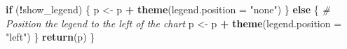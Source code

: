 \documentclass[
]{article}
\newenvironment{Shaded}{\begin{snugshade}}{\end{snugshade}}
\newcommand{\AttributeTok}[1]{\textcolor[rgb]{0.13,0.29,0.53}{#1}}
\newcommand{\CommentTok}[1]{\textcolor[rgb]{0.56,0.35,0.01}{\textit{#1}}}
\newcommand{\ControlFlowTok}[1]{\textcolor[rgb]{0.13,0.29,0.53}{\textbf{#1}}}
\newcommand{\FunctionTok}[1]{\textcolor[rgb]{0.13,0.29,0.53}{\textbf{#1}}}
\newcommand{\NormalTok}[1]{#1}
\newcommand{\OtherTok}[1]{\textcolor[rgb]{0.56,0.35,0.01}{#1}}
\newcommand{\SpecialCharTok}[1]{\textcolor[rgb]{0.81,0.36,0.00}{\textbf{#1}}}
\newcommand{\StringTok}[1]{\textcolor[rgb]{0.31,0.60,0.02}{#1}}
\begin{document}
\begin{Shaded}
\begin{Highlighting}[]
  \ControlFlowTok{if}\NormalTok{ (}\SpecialCharTok{!}\NormalTok{show\_legend) \{}
\NormalTok{    p }\OtherTok{\textless{}{-}}\NormalTok{ p }\SpecialCharTok{+} \FunctionTok{theme}\NormalTok{(}\AttributeTok{legend.position =} \StringTok{"none"}\NormalTok{)}
\NormalTok{  \} }\ControlFlowTok{else}\NormalTok{ \{}
    \CommentTok{\# Position the legend to the left of the chart}
\NormalTok{    p }\OtherTok{\textless{}{-}}\NormalTok{ p }\SpecialCharTok{+} \FunctionTok{theme}\NormalTok{(}\AttributeTok{legend.position =} \StringTok{"left"}\NormalTok{)}
\NormalTok{  \}}
  \FunctionTok{return}\NormalTok{(p)}
\NormalTok{\}}
\end{Highlighting}
\end{Shaded}

\begin{Shaded}
\end{Shaded}
\end{document}
